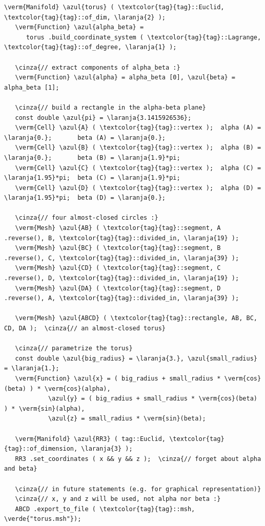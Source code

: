 \begin{Verbatim}[commandchars=\\\{\},formatcom=\small\tt,frame=single,
   label=parag-\ref{\numb section 2.\numb parag 19}.cpp,rulecolor=\color{coment},
   baselinestretch=0.94,framesep=2mm]
   \verm{Manifold} \azul{torus} ( \textcolor{tag}{tag}::Euclid, \textcolor{tag}{tag}::of_dim, \laranja{2} );
   \verm{Function} \azul{alpha_beta} =
      torus .build_coordinate_system ( \textcolor{tag}{tag}::Lagrange, \textcolor{tag}{tag}::of_degree, \laranja{1} );

   \cinza{// extract components of alpha_beta :}
   \verm{Function} \azul{alpha} = alpha_beta [0], \azul{beta} = alpha_beta [1];

   \cinza{// build a rectangle in the alpha-beta plane}
   const double \azul{pi} = \laranja{3.1415926536};
   \verm{Cell} \azul{A} ( \textcolor{tag}{tag}::vertex );  alpha (A) = \laranja{0.};       beta (A) = \laranja{0.};
   \verm{Cell} \azul{B} ( \textcolor{tag}{tag}::vertex );  alpha (B) = \laranja{0.};       beta (B) = \laranja{1.9}*pi;
   \verm{Cell} \azul{C} ( \textcolor{tag}{tag}::vertex );  alpha (C) = \laranja{1.95}*pi;  beta (C) = \laranja{1.9}*pi;
   \verm{Cell} \azul{D} ( \textcolor{tag}{tag}::vertex );  alpha (D) = \laranja{1.95}*pi;  beta (D) = \laranja{0.};

   \cinza{// four almost-closed circles :}
   \verm{Mesh} \azul{AB} ( \textcolor{tag}{tag}::segment, A .reverse(), B, \textcolor{tag}{tag}::divided_in, \laranja{19} );
   \verm{Mesh} \azul{BC} ( \textcolor{tag}{tag}::segment, B .reverse(), C, \textcolor{tag}{tag}::divided_in, \laranja{39} );
   \verm{Mesh} \azul{CD} ( \textcolor{tag}{tag}::segment, C .reverse(), D, \textcolor{tag}{tag}::divided_in, \laranja{19} );
   \verm{Mesh} \azul{DA} ( \textcolor{tag}{tag}::segment, D .reverse(), A, \textcolor{tag}{tag}::divided_in, \laranja{39} );

   \verm{Mesh} \azul{ABCD} ( \textcolor{tag}{tag}::rectangle, AB, BC, CD, DA );  \cinza{// an almost-closed torus}
   
   \cinza{// parametrize the torus}
   const double \azul{big_radius} = \laranja{3.}, \azul{small_radius} = \laranja{1.};
   \verm{Function} \azul{x} = ( big_radius + small_radius * \verm{cos}(beta) ) * \verm{cos}(alpha),
            \azul{y} = ( big_radius + small_radius * \verm{cos}(beta) ) * \verm{sin}(alpha),
            \azul{z} = small_radius * \verm{sin}(beta);

   \verm{Manifold} \azul{RR3} ( tag::Euclid, \textcolor{tag}{tag}::of_dimension, \laranja{3} );
   RR3 .set_coordinates ( x && y && z );  \cinza{// forget about alpha and beta}

   \cinza{// in future statements (e.g. for graphical representation)}
   \cinza{// x, y and z will be used, not alpha nor beta :}
   ABCD .export_to_file ( \textcolor{tag}{tag}::msh, \verde{"torus.msh"});
\end{Verbatim}

